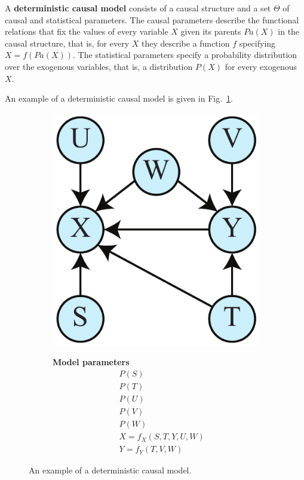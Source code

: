 \documentclass[letterpaper,onecolumn,nofootinbib]{revtex4}
\begin{document}
A \textbf{deterministic causal model} consists of a causal structure and a set $\Theta$ of
causal and statistical parameters.  The causal parameters describe the functional relations that fix the
values of every variable $X$ given its parents $Pa(X)$ in the causal structure, that is, for every $X$ they describe a function $f$ specifying $X=f(Pa(X))$.  The statistical parameters specify a probability distribution over the exogenous variables, that is, a distribution $P(X)$ for every exogenous $X$.

An example of a deterministic causal model is given in Fig.~\ref{fig:detSTAB-graph}.

\begin{figure}[htbp]
	\begin{subfigure}[b]{0.2\textwidth}
		\centering
  		\includegraphics[width=\textwidth]{det-stab-graph}
	\end{subfigure}
	\quad
	\begin{subfigure}[b]{0.2\textwidth}
		\textbf{Model parameters}
		\begin{eqnarray*}
			&&P(S)\\
			&&P(T)\\
			&&P(U)\\
			&&P(V)\\
			&&P(W)\\
			&&X= f_X(S,T,Y,U,W)\\
			&&Y= f_Y(T,V,W)
		\end{eqnarray*}
	\end{subfigure}
\caption{An example of a deterministic causal model.}
\label{fig:detSTAB-graph}
\end{figure}
\end{document}
